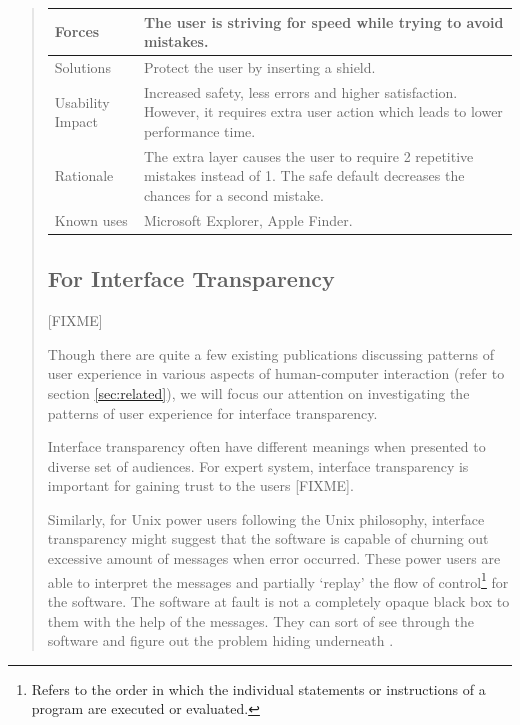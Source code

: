 \documentclass[a4paper,titlepage]{article}
\begin{document}
\begin{quote}
\begin{table}[!t]
\begin{center}
\begin{tabular}{| p{} || p{} |}
      Forces & The user is striving for speed while trying to avoid
      mistakes. \\ \hline

      Solutions & Protect the user by inserting a shield. \\ \hline

      Usability Impact & Increased safety, less errors and higher
      satisfaction. However, it requires extra user action which leads
      to lower performance time. \\ \hline

      Rationale & The extra layer causes the user to require 2
      repetitive mistakes instead of 1. The safe default decreases the
      chances for a second mistake. \\ \hline

      Known uses & Microsoft Explorer, Apple Finder. \\ \hline
    \end{tabular}
  \end{center}
\end{table}

\subsection{For Interface Transparency}

[FIXME]

Though there are quite a few existing publications discussing patterns
of user experience in various aspects of human-computer interaction
(refer to section \ref{sec:related}), we will focus our attention on
investigating the patterns of user experience for interface
transparency.

Interface transparency often have different meanings when presented to
diverse set of audiences. For expert system, interface transparency is
important for gaining trust to the users [FIXME].

Similarly, for Unix power users following the Unix philosophy,
interface transparency might suggest that the software is capable of
churning out excessive amount of messages when error occurred. These
power users are able to interpret the messages and partially `replay'
the flow of control\footnote{Refers to the order in which the
  individual statements or instructions of a program are executed or
  evaluated.}  for the software. The software at fault is not a
completely opaque black box to them with the help of the
messages. They can sort of see through the software and figure out the
problem hiding underneath \citep{unix:raymond}.


\end{quote}
\end{document}
